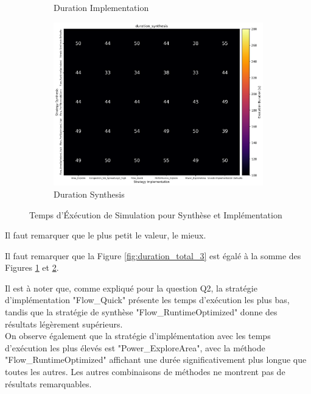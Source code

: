 \documentclass[../CSC_5RO07_TA.tex]{subfiles}
\begin{document}
\begin{figure}[h]
\begin{subfigure}[b]{0.30\textwidth}
        \caption{Duration Implementation}
        \label{fig:duration_implementation_3}
    \end{subfigure}\hfill
    \begin{subfigure}[b]{0.30\textwidth}
        \centering
        \includegraphics[width=\linewidth]{images/3_duration_synthesis.png}
        \caption{Duration Synthesis}
        \label{fig:duration_synthesis_3}
    \end{subfigure}
    \caption{Temps d'Éxécution de Simulation pour Synthèse et Implémentation}
    \label{fig:duration_3}
\end{figure}
\begin{remark}
    Il faut remarquer que le plus petit le valeur, le mieux.
\end{remark}
\begin{remark}
    Il faut remarquer que la Figure \ref{fig:duration_total_3} est égalé à la somme des Figures \ref{fig:duration_implementation_3} et \ref{fig:duration_synthesis_3}.
\end{remark}
\noindent Il est à noter que, comme expliqué pour la question Q2, la stratégie d'implémentation "Flow\_Quick" présente les temps d'exécution les plus bas, tandis que la stratégie de synthèse "Flow\_RuntimeOptimized" donne des résultats légèrement supérieurs.\\

\noindent On observe également que la stratégie d'implémentation avec les temps d'exécution les plus élevés est "Power\_ExploreArea", avec la méthode "Flow\_RuntimeOptimized" affichant une durée significativement plus longue que toutes les autres. Les autres combinaisons de méthodes ne montrent pas de résultats remarquables.\\
\end{document}
